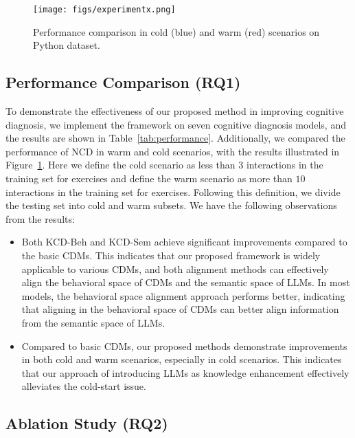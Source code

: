 \begin{figure}[t]
  \centering
  
  \texttt{[image: figs/experimentx.png]}
  \caption{Performance comparison in cold (blue) and warm (red) scenarios on Python dataset.}
  \vspace{-2em}
\label{fig: experiment1}
\end{figure}

\subsection{Performance Comparison (RQ1)}
To demonstrate the effectiveness of our proposed method in improving cognitive diagnosis, we implement the framework on seven cognitive diagnosis models, and the results are shown in Table~\ref{tab:performance}. 
Additionally, we compared the performance of NCD in warm and cold scenarios, with the results illustrated in Figure~\ref{fig: experiment1}. Here we define the cold scenario as less than $3$ interactions in the training set for exercises and define the warm scenario as more than $10$ interactions in the training set for exercises. Following this definition, we divide the testing set into cold and warm subsets.
We have the following observations from the results: 

\begin{itemize}[leftmargin=*]
    \item[1)]  
    Both KCD-Beh and KCD-Sem achieve significant improvements compared to the basic CDMs.
    This indicates that our proposed framework is widely applicable to various CDMs, and both alignment methods can effectively align the behavioral space of CDMs and the semantic space of LLMs.
    In most models, the behavioral space alignment approach performs better, indicating that aligning in the behavioral space of CDMs can better align information from the semantic space of LLMs.
    \item[2)] Compared to basic CDMs, our proposed methods demonstrate improvements in both cold and warm scenarios, especially in cold scenarios. This indicates that our approach of introducing LLMs as knowledge enhancement effectively alleviates the cold-start issue.
\end{itemize}





\subsection{Ablation Study (RQ2)}


